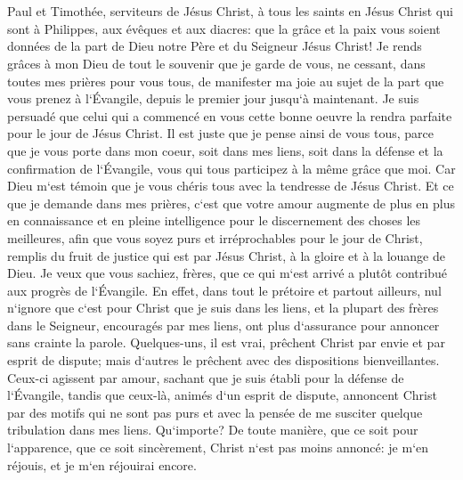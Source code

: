 

\chapter{}

\verse Paul et Timothée, serviteurs de Jésus Christ, à tous les saints en Jésus Christ qui sont à Philippes, aux évêques et aux diacres: 
\verse que la grâce et la paix vous soient données de la part de Dieu notre Père et du Seigneur Jésus Christ! 
\verse Je rends grâces à mon Dieu de tout le souvenir que je garde de vous, 
\verse ne cessant, dans toutes mes prières pour vous tous, 
\verse de manifester ma joie au sujet de la part que vous prenez à l`Évangile, depuis le premier jour jusqu`à maintenant. 
\verse Je suis persuadé que celui qui a commencé en vous cette bonne oeuvre la rendra parfaite pour le jour de Jésus Christ. 
\verse Il est juste que je pense ainsi de vous tous, parce que je vous porte dans mon coeur, soit dans mes liens, soit dans la défense et la confirmation de l`Évangile, vous qui tous participez à la même grâce que moi. 
\verse Car Dieu m`est témoin que je vous chéris tous avec la tendresse de Jésus Christ. 
\verse Et ce que je demande dans mes prières, c`est que votre amour augmente de plus en plus en connaissance et en pleine intelligence 
\verse pour le discernement des choses les meilleures, afin que vous soyez purs et irréprochables pour le jour de Christ, 
\verse remplis du fruit de justice qui est par Jésus Christ, à la gloire et à la louange de Dieu. 
\verse Je veux que vous sachiez, frères, que ce qui m`est arrivé a plutôt contribué aux progrès de l`Évangile. 
\verse En effet, dans tout le prétoire et partout ailleurs, nul n`ignore que c`est pour Christ que je suis dans les liens, 
\verse et la plupart des frères dans le Seigneur, encouragés par mes liens, ont plus d`assurance pour annoncer sans crainte la parole. 
\verse Quelques-uns, il est vrai, prêchent Christ par envie et par esprit de dispute; mais d`autres le prêchent avec des dispositions bienveillantes. 
\verse Ceux-ci agissent par amour, sachant que je suis établi pour la défense de l`Évangile, 
\verse tandis que ceux-là, animés d`un esprit de dispute, annoncent Christ par des motifs qui ne sont pas purs et avec la pensée de me susciter quelque tribulation dans mes liens. 
\verse Qu`importe? De toute manière, que ce soit pour l`apparence, que ce soit sincèrement, Christ n`est pas moins annoncé: je m`en réjouis, et je m`en réjouirai encore. 
